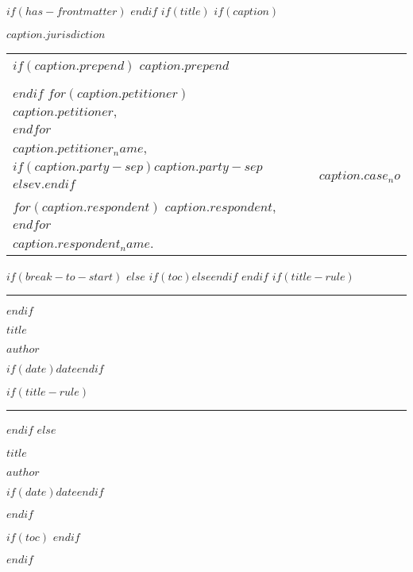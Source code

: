 $if(has-frontmatter)$
\frontmatter
$endif$
$if(title)$
\thispagestyle{empty}
$if(caption)$
\begin{center}\bfseries
    $caption.jurisdiction$
\end{center}

\vspace{1em}

\setlength{\tabcolsep}{0em}
\setlength{\parindent}{0em}
\begin{tabular}{p{} p{} | p{} p{}}
    \vspace{0.5em}
    $if(caption.prepend)$
    $caption.prepend$ &&& \\ &&& \\
    $endif$
    $for(caption.petitioner)$
    $caption.petitioner$, &&& \\
    $endfor$ &&& \\
    \hspace{5em}\textit{$caption.petitioner_name$}, & & & \\
    \vspace{0.5em}
    \hspace{2em}$if(caption.party-sep)$$caption.party-sep$$else$v.$endif$ & & &
    \vspace{0.5em} $caption.case_no$ \\
    \vspace{1em}
    $for(caption.respondent)$
    $caption.respondent$, &&& \\
    $endfor$ &&& \\
    \hspace{5em}\textit{$caption.respondent_name$}.
    & & &
    \vspace*{1em} \\
    \cline{1-2}
\end{tabular}
\setlength{\parindent}{0.5in}
\setlength{\tabcolsep}{6pt}

\vspace{2em}

$if(break-to-start)$
\vspace{2em}
$else$
$if(toc)$\vspace{2em}$else$\vspace{0.5em}$endif$
$endif$
$if(title-rule)$
\hrule
$endif$
\begin{center}\bfseries
    \MakeUppercase{$title$}

    $author$

    $if(date)$$date$$endif$
\end{center}
$if(title-rule)$
\hrule
$endif$
$else$
\vspace*{2in}
\begin{center}\bfseries
    $title$

    $author$

    \vspace{1em}

    $if(date)$$date$$endif$
\end{center}
$endif$

$if(toc)$
\clearpage
$endif$

$endif$
